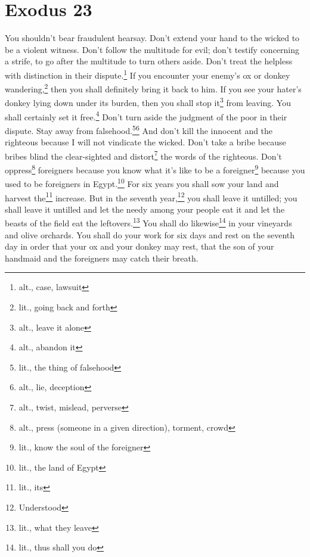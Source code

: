 \section{Exodus 23}\label{Exodus 23}
\begin{enumerate}[align=center]
     You shouldn't bear fraudulent hearsay. Don't extend your hand to the wicked to be a violent witness.%
     Don't follow the multitude for evil; don't testify concerning a strife, to go after the multitude to turn others aside.%
     Don't treat the helpless with distinction in their dispute.\footnote{alt., case, lawsuit}%
     If you encounter your enemy's ox or donkey wandering,\footnote{lit., going back and forth} then you shall definitely bring it back to him.%
     If you see your hater's donkey lying down under its burden, then you shall stop it\footnote{alt., leave it alone} from leaving. You shall certainly set it free.\footnote{alt., abandon it}%
     Don't turn aside the judgment of the poor in their dispute.%
     Stay away from falsehood.\footnote{lit., the thing of falsehood}\footnote{alt., lie, deception} And don't kill the innocent and the righteous because I will not vindicate the wicked.%
     Don't take a bribe because bribes blind the clear-sighted and distort\footnote{alt., twist, mislead, perverse} the words of the righteous.%
     Don't oppress\footnote{alt., press (someone in a given direction), torment, crowd} foreigners because you know what it's like to be a foreigner\footnote{lit., know the soul of the foreigner} because you used to be foreigners in Egypt.\footnote{lit., the land of Egypt}%
     For six years you shall sow your land and harvest the\footnote{lit., its} increase.%
     But in the seventh year,\footnote{Understood} you shall leave it untilled; you shall leave it untilled and let the needy among your people eat it and let the beasts of the field eat the leftovers.\footnote{lit., what they leave} You shall do likewise\footnote{lit., thus shall you do} in your vineyards and olive orchards.%
     You shall do your work for six days and rest on the seventh day in order that your ox and your donkey may rest, that the son of your handmaid and the foreigners may catch their breath.%

\end{enumerate}
